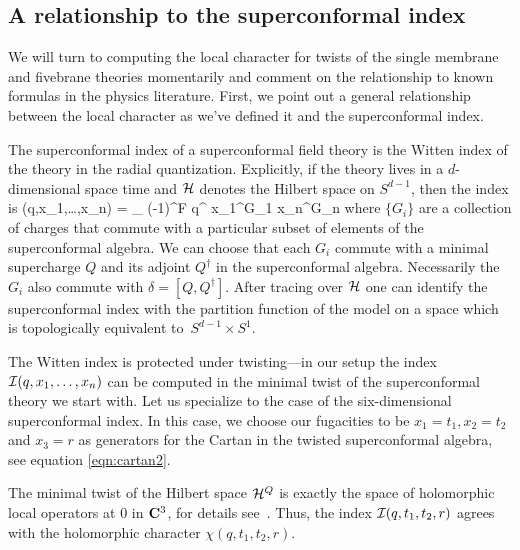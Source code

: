 \subsection{A relationship to the superconformal index}

We will turn to computing the local character for twists of the single membrane and fivebrane theories momentarily and comment on the relationship to known formulas in the physics literature. 
First, we point out a general relationship between the local character as we've defined it and the superconformal index. 

The superconformal index of a superconformal field theory is the Witten index of the theory in the radial quantization.
Explicitly, if the theory lives in a $d$-dimensional space time and $\mathcal H$ denotes the Hilbert space on $S^{d-1}$, then the index is
\beqn
\cI(q,x_1,\ldots,x_n) = \Tr_{\cH} (-1)^F q^{\delta} x_1^{G_1} \cdots x_n^{G_n} 
\eeqn
where $\{G_i\}$ are a collection of charges that commute with a particular subset of elements of the superconformal algebra. 
We can choose that each $G_i$ commute with a minimal supercharge $Q$ and its adjoint $Q^{\dagger}$ in the superconformal algebra.
Necessarily the $G_i$ also commute with $\delta = [Q,Q^{\dagger}]$.
After tracing over $\mathcal H$ one can identify the superconformal index with the partition function of the model on a space which is topologically equivalent to~$S^{d-1} \times S^1$.

The Witten index is protected under twisting---in our setup the index $\mathcal I(q,x_1,\ldots,x_n)$ can be computed in the minimal twist of the superconformal theory we start with.
Let us specialize to the case of the six-dimensional superconformal index. 
In this case, we choose our fugacities to be $x_1 = t_1, x_2 = t_2$ and $x_3 = r$ as generators for the Cartan in the twisted superconformal algebra, see equation \eqref{eqn:cartan2}. 

The minimal twist of the Hilbert space $\mathcal H^Q$ is exactly the space of holomorphic local operators at $0$ in $\mathbf{C}^3$, for details see~\cite{SWchar}. 
Thus, the index $\mathcal I(q,t_1,t_2,r)$ agrees with the holomorphic character $\chi(q,t_1,t_2,r)$.

